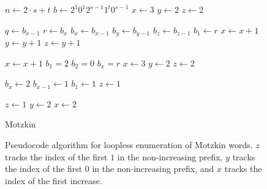 \begin{figure}
    \centering
        \begin{algorithm}[H]
        \begin{algorithmic}
        \EndFunction{}
         
        \State $n \gets 2 \cdot s+t$
        \State $b \gets 2^1 0^1 2^{s-1} 1^t 0^{s-1}$
        \State $x \gets 3$
        \State $y \gets 2$
        \State $z \gets 2$
        
        \State {}
        
            \State $q \gets b_{x-1}$
            \State $r \gets b_x$
            \vspace{.4em} 
            \State $b_x\gets b_{x-1}$
            \State $b_y\gets b_{y-1}$
            \State $b_z\gets b_{z-1}$
            \State $b_1\gets r$
            \vspace{.4em} 
            \State $x \gets x+1$
            \State $y \gets y+1$
            \State $z \gets y+1$
            
            \vspace{.4em} 
                    \State $x \gets x+1$
                \Else 
                    \State $b_1=2$
                    \State $b_2=0$
                    \State $b_x=r$
                    \State $x \gets 3$
                    \State $y \gets 2$
                    \State $z \gets 2$
                
                \EndIf
                    \State $b_x \gets 2$     
                    \State $b_{x-1} \gets 1$     
                    \State $b_1 \gets 1$     
                    \State $z \gets 1$     

                
            \EndIf
                \State $z \gets 1$
                \State $y \gets 2$
                \State $x \gets 2$
            \EndIf
        \EndWhile
        \end{algorithmic}
        \caption{Motzkin}
        \end{algorithm}
    \caption[Pseudocode algorithm for loopless enumeration of Motzkin words.]{Pseudocode algorithm for loopless enumeration of Motzkin words. $z$ tracks the index of the first $1$ in the non-increasing prefix, $y$ tracks the index of the first $0$ in the non-increasing prefix, and $x$ tracks the index of the first increase.}
    \label{fig:motzkinAlg}
\end{figure}
